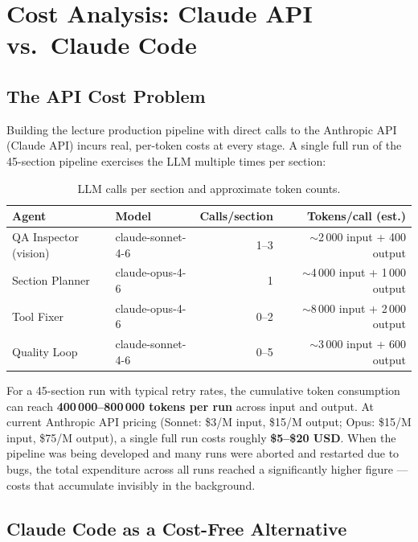 \documentclass[12pt,a4paper]{article}
\begin{document}
\section{Cost Analysis: Claude API vs.\ Claude Code}
\label{sec:cost}

\subsection{The API Cost Problem}

Building the lecture production pipeline with direct calls to the Anthropic API
(Claude API) incurs real, per-token costs at every stage. A single full run of
the 45-section pipeline exercises the LLM multiple times per section:

\begin{table}[h]
\centering\small
\begin{tabular}{@{}llrr@{}}
\toprule
\textbf{Agent} & \textbf{Model} & \textbf{Calls/section} & \textbf{Tokens/call (est.)} \\
\midrule
QA Inspector (vision)  & claude-sonnet-4-6 & 1--3 & $\sim$2\,000 input + 400 output \\
Section Planner        & claude-opus-4-6   & 1    & $\sim$4\,000 input + 1\,000 output \\
Tool Fixer             & claude-opus-4-6   & 0--2 & $\sim$8\,000 input + 2\,000 output \\
Quality Loop           & claude-sonnet-4-6 & 0--5 & $\sim$3\,000 input + 600 output \\
\bottomrule
\end{tabular}
\caption{LLM calls per section and approximate token counts.}
\end{table}

For a 45-section run with typical retry rates, the cumulative token consumption
can reach \textbf{400\,000--800\,000 tokens per run} across input and output.
At current Anthropic API pricing (Sonnet: \$3/M input, \$15/M output;
Opus: \$15/M input, \$75/M output), a single full run costs roughly
\textbf{\$5--\$20 USD}. When the pipeline was being developed and many runs were
aborted and restarted due to bugs, the total expenditure across all runs reached
a significantly higher figure — costs that accumulate invisibly in the background.

\subsection{Claude Code as a Cost-Free Alternative}
\end{document}
